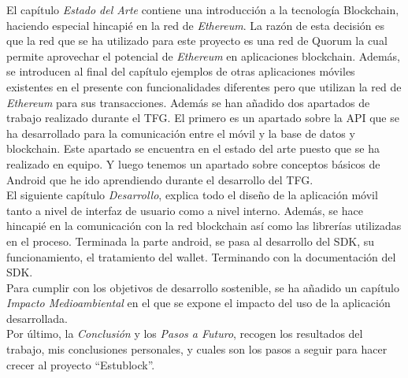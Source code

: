 El capítulo \emph{Estado del Arte} contiene una introducción a la tecnología Blockchain, haciendo especial hincapié en la red de \emph{Ethereum}\cite{webEthereum}. La razón de esta decisión es que la red que se ha utilizado para este proyecto es una red de Quorum\cite{webQuorum} la cual permite aprovechar el potencial de \emph{Ethereum} en aplicaciones blockchain. Además, se introducen al final del capítulo ejemplos de otras aplicaciones móviles existentes en el presente con funcionalidades diferentes pero que utilizan la red de \emph{Ethereum} para sus transacciones. Además se han añadido dos apartados de trabajo realizado durante el TFG. El primero es un apartado sobre la API que se ha desarrollado para la comunicación entre el móvil y la base de datos y blockchain. Este apartado se encuentra en el estado del arte puesto que se ha realizado en equipo. Y luego tenemos un apartado sobre conceptos básicos de Android que he ido aprendiendo durante el desarrollo del TFG. \\

El siguiente capítulo \emph{Desarrollo}, explica todo el diseño de la aplicación móvil tanto a nivel de interfaz de usuario como a nivel interno. Además, se hace hincapié en la comunicación con la red blockchain así como las librerías utilizadas en el proceso. Terminada la parte android, se pasa al desarrollo del SDK, su funcionamiento, el tratamiento del wallet. Terminando con la documentación del SDK. \\

Para cumplir con los objetivos de desarrollo sostenible, se ha añadido un capítulo \emph{Impacto Medioambiental} en el que se expone el impacto del uso de la aplicación desarrollada. \\

Por último, la \emph{Conclusión} y los \emph{Pasos a Futuro}, recogen los resultados del trabajo, mis conclusiones personales, y cuales son los pasos a seguir para hacer crecer al proyecto ``Estublock''.

